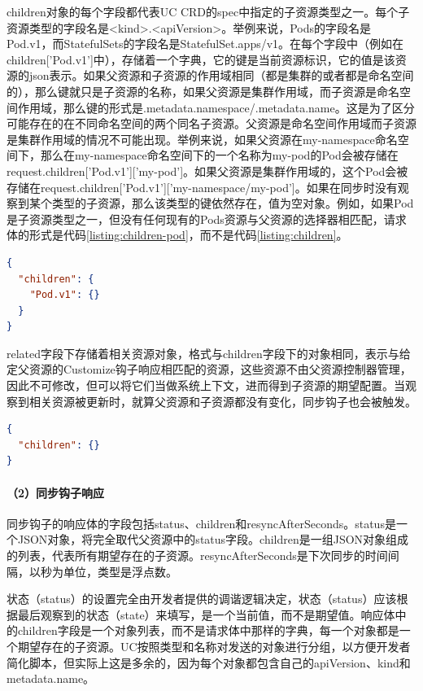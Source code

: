 \documentclass[macfonts,master]{njuthesis}
\begin{document}
children对象的每个字段都代表UC CRD的spec中指定的子资源类型之一。每个子资源类型的字段名是<kind>.<apiVersion>。举例来说，Pods的字段名是Pod.v1，而StatefulSets的字段名是StatefulSet.apps/v1。在每个字段中（例如在children['Pod.v1']中），存储着一个字典，它的键是当前资源标识，它的值是该资源的json表示。如果父资源和子资源的作用域相同（都是集群的或者都是命名空间的），那么键就只是子资源的名称，如果父资源是集群作用域，而子资源是命名空间作用域，那么键的形式是{.metadata.namespace}/{.metadata.name}。这是为了区分可能存在的在不同命名空间的两个同名子资源。父资源是命名空间作用域而子资源是集群作用域的情况不可能出现。举例来说，如果父资源在my-namespace命名空间下，那么在my-namespace命名空间下的一个名称为my-pod的Pod会被存储在request.children['Pod.v1']['my-pod']。如果父资源是集群作用域的，这个Pod会被存储在request.children['Pod.v1']['my-namespace/my-pod']。如果在同步时没有观察到某个类型的子资源，那么该类型的键依然存在，值为空对象。例如，如果Pod是子资源类型之一，但没有任何现有的Pods资源与父资源的选择器相匹配，请求体的形式是代码\ref{listing:children-pod}，而不是代码\ref{listing:children}。
\begin{lstlisting}[language=json,caption=请求体,label=listing:children-pod]
{
  "children": {
    "Pod.v1": {}
  }
}
\end{lstlisting}

related字段下存储着相关资源对象，格式与children字段下的对象相同，表示与给定父资源的Customize钩子响应相匹配的资源，这些资源不由父资源控制器管理，因此不可修改，但可以将它们当做系统上下文，进而得到子资源的期望配置。当观察到相关资源被更新时，就算父资源和子资源都没有变化，同步钩子也会被触发。


\begin{lstlisting}[language=json,caption=异常请求体,label=listing:children]
{
  "children": {}
}
\end{lstlisting}

\paragraph{（2）同步钩子响应}
同步钩子的响应体的字段包括status、children和resyncAfterSeconds。status是一个JSON对象，将完全取代父资源中的status字段。children是一组JSON对象组成的列表，代表所有期望存在的子资源。resyncAfterSeconds是下次同步的时间间隔，以秒为单位，类型是浮点数。

状态（status）的设置完全由开发者提供的调谐逻辑决定，状态（status）应该根据最后观察到的状态（state）来填写，是一个当前值，而不是期望值。响应体中的children字段是一个对象列表，而不是请求体中那样的字典，每一个对象都是一个期望存在的子资源。UC按照类型和名称对发送的对象进行分组，以方便开发者简化脚本，但实际上这是多余的，因为每个对象都包含自己的apiVersion、kind和metadata.name。
\end{document}
